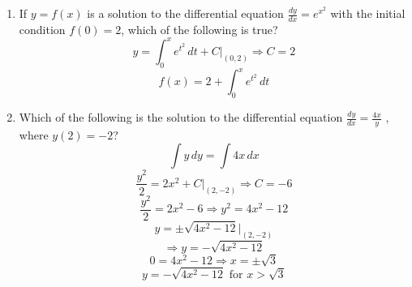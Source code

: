 \documentclass[12pt]{article}
\begin{document}
\begin{enumerate}
\item If $y = f(x)$ is a solution to the differential equation $\frac{dy}{dx}=e^{x^2}$ with the initial condition $f(0) = 2$, which of the following is true?
$$y=\int_{0}^{x} e^{t^2} \, dt + C \biggr\rvert_{(0,2)} \Longrightarrow C=2$$
$$\boxed{f(x)=2+\int_{0}^{x} e^{t^2} \, dt}$$
\item Which of the following is the solution to the differential equation $\frac{dy}{dx}=\frac{4x}{y}$ , where $y(2)=-2$?
$$\int y \, dy = \int 4x\,dx$$
$$\frac{y^2}{2}=2x^2+C \biggr\rvert_{(2,-2)} \Longrightarrow C=-6$$
$$\frac{y^2}{2}=2x^2-6 \Longrightarrow y^2=4x^2-12$$
$$y = \pm \sqrt{4x^2-12} \biggr\rvert_{(2,-2)}$$ 
$$\Longrightarrow y=-\sqrt{4x^2-12}$$
$$0=4x^2-12 \Longrightarrow x=\pm \sqrt{3}$$
$$\boxed{y=-\sqrt{4x^2-12} \text{ for } x>\sqrt{3}}$$ 
\end{enumerate}
\end{document}
